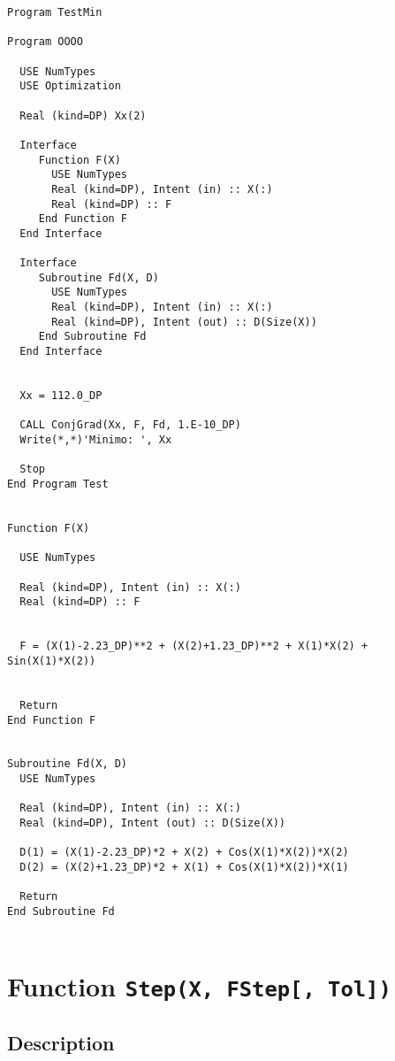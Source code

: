 \begin{lstlisting}[emph=ConjGrad,
                   emphstyle=\color{blue},
                   frame=trBL,
                   caption=Minimising a function.,
                   label=ConjGrad]
Program TestMin

Program OOOO

  USE NumTypes
  USE Optimization
  
  Real (kind=DP) Xx(2)

  Interface 
     Function F(X)
       USE NumTypes
       Real (kind=DP), Intent (in) :: X(:)
       Real (kind=DP) :: F
     End Function F
  End Interface

  Interface 
     Subroutine Fd(X, D)
       USE NumTypes
       Real (kind=DP), Intent (in) :: X(:)
       Real (kind=DP), Intent (out) :: D(Size(X))
     End Subroutine Fd
  End Interface


  Xx = 112.0_DP

  CALL ConjGrad(Xx, F, Fd, 1.E-10_DP)
  Write(*,*)'Minimo: ', Xx

  Stop
End Program Test


Function F(X)

  USE NumTypes
  
  Real (kind=DP), Intent (in) :: X(:)
  Real (kind=DP) :: F


  F = (X(1)-2.23_DP)**2 + (X(2)+1.23_DP)**2 + X(1)*X(2) + Sin(X(1)*X(2))


  Return
End Function F


Subroutine Fd(X, D)
  USE NumTypes
  
  Real (kind=DP), Intent (in) :: X(:)
  Real (kind=DP), Intent (out) :: D(Size(X))

  D(1) = (X(1)-2.23_DP)*2 + X(2) + Cos(X(1)*X(2))*X(2)
  D(2) = (X(2)+1.23_DP)*2 + X(1) + Cos(X(1)*X(2))*X(1)

  Return
End Subroutine Fd


\end{lstlisting}



\section{Function \texttt{Step(X, FStep[, Tol]) }}

\subsection{Description}

